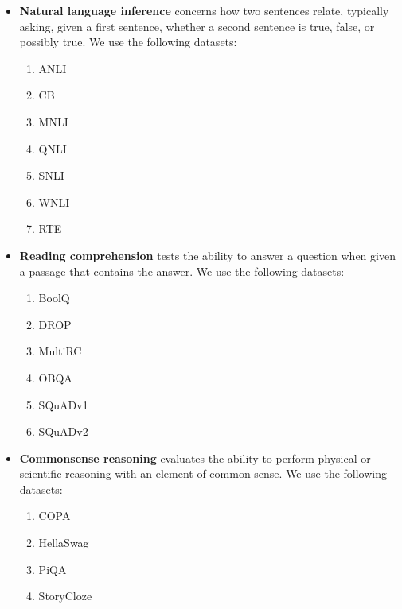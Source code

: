 \begin{itemize}[leftmargin=*]
    \itemsep0em 
    \item \textbf{Natural language inference} concerns how two sentences relate, typically asking, given a first sentence, whether a second sentence is true, false, or possibly true.
    We use the following datasets:
    \begin{enumerate}
        \item ANLI \citep{anli}
        \item CB \citep{de2019commitmentbank}
        \item MNLI \citep{N18-1101}
        \item QNLI \citep{rajpurkar-etal-2018-know}
        \item SNLI \citep{bowman-etal-2015-large}
        \item WNLI \citep{levesque2012winograd}
        \item RTE \citep{10.1007/11736790_9,haim2006second,giampiccolo-etal-2007-third,bentivogli2009fifth}
    \end{enumerate}
    \item \textbf{Reading comprehension} tests the ability to answer a question when given a passage that contains the answer. 
    We use the following datasets:
    \begin{enumerate}
        \item BoolQ \cite{clark-etal-2019-boolq}
        \item DROP \citep{Dua2019DROP}
        \item MultiRC \citep{khashabi-etal-2018-looking}
        \item OBQA \citep{mihaylov-etal-2018-suit}
        \item SQuADv1 \citep{rajpurkar-etal-2016-squad}
        \item SQuADv2 \citep{rajpurkar-etal-2018-know}
    \end{enumerate}
    \item \textbf{Commonsense reasoning} evaluates the ability to perform physical or scientific reasoning with an element of common sense. 
    We use the following datasets:
    \begin{enumerate}
        \item COPA \citep{SSS112418}
        \item HellaSwag \citep{zellers-etal-2019-hellaswag}
        \item PiQA \citep{Bisk2020}
        \item StoryCloze \citep{mostafazadeh-etal-2016-corpus}

\end{enumerate}
\end{itemize}
